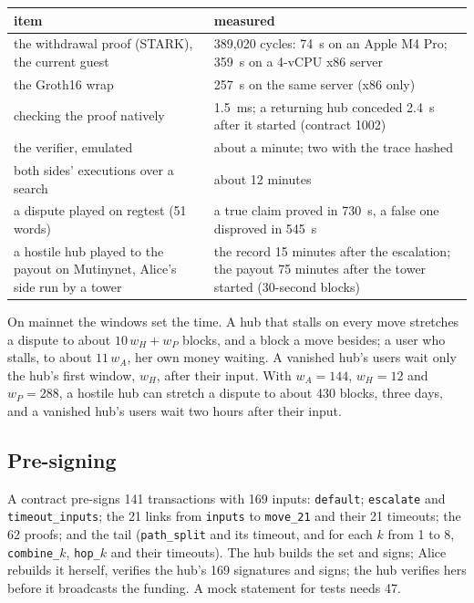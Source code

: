 \documentclass[11pt]{article}
\newcommand{\tx}[1]{\texttt{#1}}
\begin{document}
\begin{center}
\small
\begin{tabularx}{\linewidth}{>{\raggedright\arraybackslash}p{70mm}L}
\toprule
item & measured \\
\midrule
the withdrawal proof (STARK), the current guest & 389,020 cycles: 74~s on an Apple M4 Pro; 359~s on a 4-vCPU x86 server \\
the Groth16 wrap & 257~s on the same server (x86 only) \\
checking the proof natively & 1.5~ms; a returning hub conceded 2.4~s after it started (contract 1002) \\
the verifier, emulated & about a minute; two with the trace hashed \\
both sides' executions over a search & about 12 minutes \\
a dispute played on regtest (51 words) & a true claim proved in 730~s, a false one disproved in 545~s \\
a hostile hub played to the payout on Mutinynet, Alice's side run by a tower & the record 15 minutes after the escalation; the payout 75 minutes after the tower started (30-second blocks) \\
\bottomrule
\end{tabularx}
\end{center}
On mainnet the windows set the time. A hub that stalls on every move
stretches a dispute to about $10\,w_H + w_P$ blocks, and a block a move
besides; a user who stalls, to about $11\,w_A$, her own money waiting. A
vanished hub's users wait only the hub's first window, $w_H$, after
their input. With $w_A = 144$, $w_H = 12$ and
$w_P = 288$, a hostile hub can stretch a dispute to about 430 blocks,
three days, and a vanished hub's users wait two hours after their input.

\subsection{Pre-signing}

A contract pre-signs 141 transactions with 169 inputs: \tx{default};
\tx{escalate} and \tx{timeout\_inputs}; the 21 links from \tx{inputs}
to \tx{move\_21} and their 21 timeouts; the 62 proofs; and the tail
(\tx{path\_split} and its timeout, and for each $k$ from 1 to 8,
\tx{combine\_$k$}, \tx{hop\_$k$} and their timeouts). The hub builds the
set and signs; Alice rebuilds it herself, verifies the hub's 169
signatures and signs; the hub verifies hers before it broadcasts the
funding. A mock statement for tests needs 47.
\end{document}
